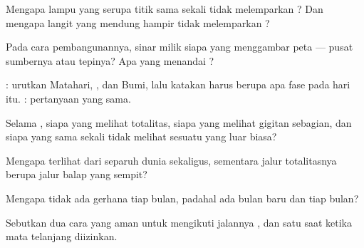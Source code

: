 \begin{exercise}[$\star$]\label{exo:g7:shadows-eclipses:2}
Mengapa lampu yang serupa titik sama sekali tidak melemparkan
? Dan mengapa langit yang mendung hampir tidak melemparkan
?
\end{exercise}

\begin{exercise}[$\star$]\label{exo:g7:shadows-eclipses:3}
Pada cara pembangunannya, sinar milik siapa yang menggambar peta
 --- pusat sumbernya atau tepinya? Apa yang menandai
?
\end{exercise}

\begin{exercise}[$\star$]\label{exo:g7:shadows-eclipses:4}
: urutkan Matahari, , dan Bumi, lalu katakan
harus berupa apa fase  pada hari itu. : pertanyaan
yang sama.
\end{exercise}

\begin{exercise}[$\star$]\label{exo:g7:shadows-eclipses:5}
Selama , siapa yang melihat totalitas, siapa yang
melihat gigitan sebagian, dan siapa yang sama sekali tidak melihat
sesuatu yang luar biasa?
\end{exercise}

\begin{exercise}[$\star$]\label{exo:g7:shadows-eclipses:6}
Mengapa  terlihat dari separuh dunia sekaligus, sementara
jalur totalitasnya berupa jalur balap yang sempit?
\end{exercise}

\begin{exercise}[$\star$]\label{exo:g7:shadows-eclipses:7}
Mengapa tidak ada gerhana tiap bulan, padahal ada bulan baru dan  tiap bulan?
\end{exercise}

\begin{exercise}[$\star$]\label{exo:g7:shadows-eclipses:8}
Sebutkan dua cara yang aman untuk mengikuti jalannya ,
dan satu saat ketika mata telanjang diizinkan.
\end{exercise}

